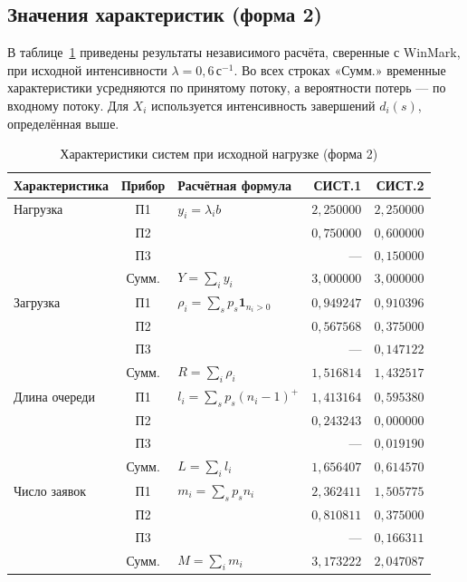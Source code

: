 \documentclass[a4paper,12pt]{article}
\newcommand{\secunit}{\,\text{с}^{-1}}
\begin{document}
\clearpage
\subsection{Значения характеристик (форма 2)}
В таблице~\ref{tab:metrics} приведены результаты независимого расчёта, сверенные с WinMark, при исходной интенсивности $\lambda=0{,}6\secunit$. Во всех строках «Сумм.» временные характеристики усредняются по принятому потоку, а вероятности потерь --- по входному потоку. Для $X_i$ используется интенсивность завершений $d_i(s)$, определённая выше.

\begin{table}[H]\centering\footnotesize
\caption{Характеристики систем при исходной нагрузке (форма 2)}\label{tab:metrics}
\setlength{\tabcolsep}{4pt}\renewcommand{\arraystretch}{1.02}
\begin{tabular}{@{}>{\raggedright\arraybackslash}p{3.0cm}c p{5.3cm}rr@{}}\toprule
Характеристика & Прибор & Расчётная формула & СИСТ.1 & СИСТ.2\\\midrule
Нагрузка & П1 & $y_i=\lambda_i b$ & $2{,}250000$ & $2{,}250000$ \\
 & П2 &  & $0{,}750000$ & $0{,}600000$ \\
 & П3 &  & --- & $0{,}150000$ \\
 & Сумм. & $Y=\sum_i y_i$ & $3{,}000000$ & $3{,}000000$ \\
\addlinespace[3pt]
Загрузка & П1 & $\rho_i=\sum_s p_s\mathbf1_{n_i>0}$ & $0{,}949247$ & $0{,}910396$ \\
 & П2 &  & $0{,}567568$ & $0{,}375000$ \\
 & П3 &  & --- & $0{,}147122$ \\
 & Сумм. & $R=\sum_i\rho_i$ & $1{,}516814$ & $1{,}432517$ \\
\addlinespace[3pt]
Длина очереди & П1 & $l_i=\sum_s p_s(n_i-1)^+$ & $1{,}413164$ & $0{,}595380$ \\
 & П2 &  & $0{,}243243$ & $0{,}000000$ \\
 & П3 &  & --- & $0{,}019190$ \\
 & Сумм. & $L=\sum_i l_i$ & $1{,}656407$ & $0{,}614570$ \\
\addlinespace[3pt]
Число заявок & П1 & $m_i=\sum_s p_s n_i$ & $2{,}362411$ & $1{,}505775$ \\
 & П2 &  & $0{,}810811$ & $0{,}375000$ \\
 & П3 &  & --- & $0{,}166311$ \\
 & Сумм. & $M=\sum_i m_i$ & $3{,}173222$ & $2{,}047087$ \\

\end{tabular}
\end{table}
\end{document}
